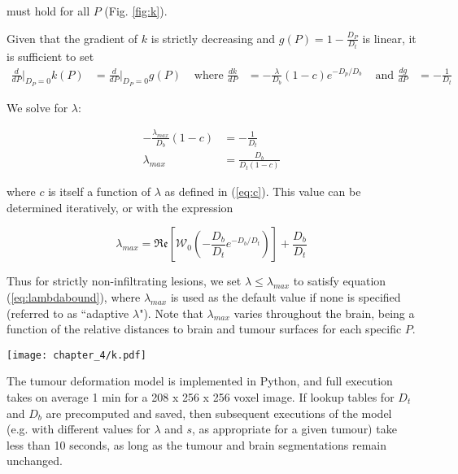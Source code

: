 must hold for all $P$ (Fig. \ref{fig:k}).

Given that the gradient of $k$ is strictly decreasing and $g(P) = 1 - \frac{D_P}{D_t}$ is linear, it is sufficient to set
\begin{align*}
  \frac{d}{dP}\bigg\rvert_{D_P=0}k(P) &= \frac{d}{dP}\bigg\rvert_{D_P=0}g(P) &\text{ where } \frac{dk}{dP} &= -\frac{\lambda}{D_b}(1-c)e^{-D_p/D_b} &\text{ and } \frac{dg}{dP} &= -\frac{1}{D_t}
\end{align*}

We solve for $\lambda$:

\begin{align*}
  -\frac{\lambda_{max}}{D_b}(1-c) &= -\frac{1}{D_t} \\
  \lambda_{max} &= \frac{D_b}{D_t (1-c)}
\end{align*}

where $c$ is itself a function of $\lambda$ as defined in (\ref{eq:c}). This value can be determined iteratively, or with the expression

\begin{equation}
  \lambda_{max} = \mathfrak{Re} \left[ \mathcal{W}_0(-\frac{D_b}{D_t}e^{-D_b/D_t}) \right] +\frac{D_b}{D_t}
\end{equation}

Thus for strictly non-infiltrating lesions, we set $\lambda \leq \lambda_{max}$ to satisfy equation (\ref{eq:lambdabound}), where $\lambda_{max}$ is used as the default value if none is specified (referred to as ``adaptive $\lambda$").
Note that $\lambda_{max}$ varies throughout the brain, being a function of the relative distances to brain and tumour surfaces for each specific $P$.

\begin{SCfigure}[][h!]
  \captionsetup{format=plain}
  \texttt{[image: chapter\_4/k.pdf]}
  \caption{Deformation factor $k$ as a function of $D_P$. $\lambda$ must be small enough such that $k_{\lambda}$ is strictly above the line $1-(\frac{D_P}{D_t})$ (dashed line). An exponential $k$ with $\lambda_{max}$ is plotted in solid black, compared with a linear $k$ as proposed in \textcite{Nowinski2005} (dotted line).}
  \label{fig:k}
\end{SCfigure}

The tumour deformation model is implemented in Python, and full execution takes on average 1 min for a 208 x 256 x 256 voxel image.
If lookup tables for $ D_t$ and $D_b$ are precomputed and saved, then subsequent executions of the model (e.g. with different values for $\lambda$ and $s$, as appropriate for a given tumour) take less than 10 seconds, as long as the tumour and brain segmentations remain unchanged.

